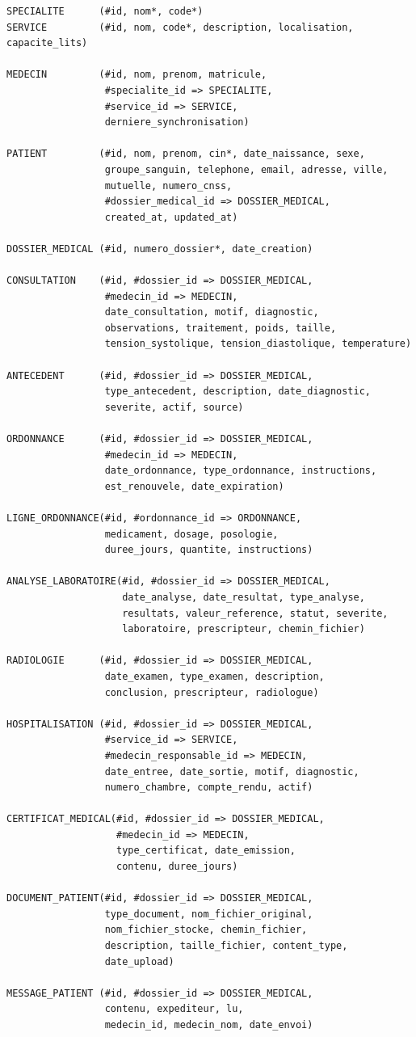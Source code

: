 \begin{verbatim}
SPECIALITE      (#id, nom*, code*)
SERVICE         (#id, nom, code*, description, localisation, capacite_lits)

MEDECIN         (#id, nom, prenom, matricule,
                 #specialite_id => SPECIALITE,
                 #service_id => SERVICE,
                 derniere_synchronisation)

PATIENT         (#id, nom, prenom, cin*, date_naissance, sexe,
                 groupe_sanguin, telephone, email, adresse, ville,
                 mutuelle, numero_cnss,
                 #dossier_medical_id => DOSSIER_MEDICAL,
                 created_at, updated_at)

DOSSIER_MEDICAL (#id, numero_dossier*, date_creation)

CONSULTATION    (#id, #dossier_id => DOSSIER_MEDICAL,
                 #medecin_id => MEDECIN,
                 date_consultation, motif, diagnostic,
                 observations, traitement, poids, taille,
                 tension_systolique, tension_diastolique, temperature)

ANTECEDENT      (#id, #dossier_id => DOSSIER_MEDICAL,
                 type_antecedent, description, date_diagnostic,
                 severite, actif, source)

ORDONNANCE      (#id, #dossier_id => DOSSIER_MEDICAL,
                 #medecin_id => MEDECIN,
                 date_ordonnance, type_ordonnance, instructions,
                 est_renouvele, date_expiration)

LIGNE_ORDONNANCE(#id, #ordonnance_id => ORDONNANCE,
                 medicament, dosage, posologie,
                 duree_jours, quantite, instructions)

ANALYSE_LABORATOIRE(#id, #dossier_id => DOSSIER_MEDICAL,
                    date_analyse, date_resultat, type_analyse,
                    resultats, valeur_reference, statut, severite,
                    laboratoire, prescripteur, chemin_fichier)

RADIOLOGIE      (#id, #dossier_id => DOSSIER_MEDICAL,
                 date_examen, type_examen, description,
                 conclusion, prescripteur, radiologue)

HOSPITALISATION (#id, #dossier_id => DOSSIER_MEDICAL,
                 #service_id => SERVICE,
                 #medecin_responsable_id => MEDECIN,
                 date_entree, date_sortie, motif, diagnostic,
                 numero_chambre, compte_rendu, actif)

CERTIFICAT_MEDICAL(#id, #dossier_id => DOSSIER_MEDICAL,
                   #medecin_id => MEDECIN,
                   type_certificat, date_emission,
                   contenu, duree_jours)

DOCUMENT_PATIENT(#id, #dossier_id => DOSSIER_MEDICAL,
                 type_document, nom_fichier_original,
                 nom_fichier_stocke, chemin_fichier,
                 description, taille_fichier, content_type,
                 date_upload)

MESSAGE_PATIENT (#id, #dossier_id => DOSSIER_MEDICAL,
                 contenu, expediteur, lu,
                 medecin_id, medecin_nom, date_envoi)
\end{verbatim}

